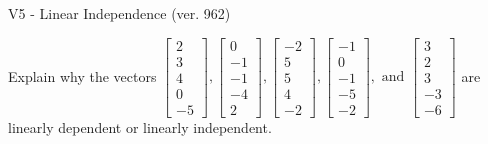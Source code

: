 \begin{exercise}
  \begin{exerciseTitle}V5 - Linear Independence (ver. 962)\end{exerciseTitle}
  \begin{exerciseStatement}
    Explain why the vectors \(\left[\begin{array}{r}
2 \\
3 \\
4 \\
0 \\
-5
\end{array}\right] , \left[\begin{array}{r}
0 \\
-1 \\
-1 \\
-4 \\
2
\end{array}\right] , \left[\begin{array}{r}
-2 \\
5 \\
5 \\
4 \\
-2
\end{array}\right] , \left[\begin{array}{r}
-1 \\
0 \\
-1 \\
-5 \\
-2
\end{array}\right] , \text{ and } \left[\begin{array}{r}
3 \\
2 \\
3 \\
-3 \\
-6
\end{array}\right]\) are linearly dependent or linearly independent.	



\end{exerciseStatement}
\end{exercise}
